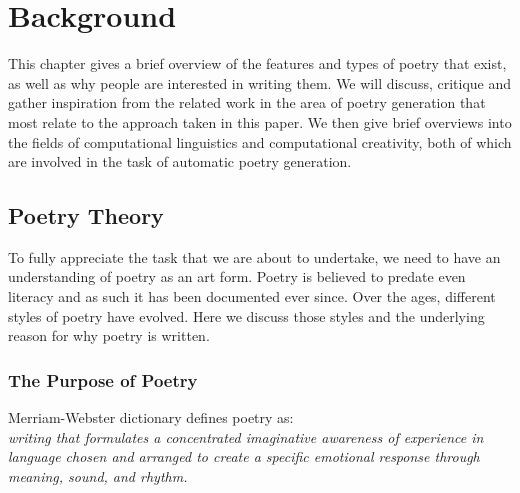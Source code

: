 
\chapter{Background}
\ifpdf
    \graphicspath{{Design/DesignFigs/PNG/}{Design/DesignFigs/PDF/}{Design/DesignFigs/}}
\else
    \graphicspath{{Design/DesignFigs/EPS/}{Design/DesignFigs/}}
\fi

This chapter gives a brief overview of the features and types of poetry that exist, as well as why people are interested in writing them. We will discuss, critique and gather inspiration from the related work in the area of poetry generation that most relate to the approach taken in this paper. We then give brief overviews into the fields of computational linguistics and computational creativity, both of which are involved in the task of automatic poetry generation. 

\section{Poetry Theory}

To fully appreciate the task that we are about to undertake, we need to have an understanding of poetry as an art form. Poetry is believed to predate even literacy and as such it has been documented ever since. Over the ages, different styles of poetry have evolved. Here we discuss those styles and the underlying reason for why poetry is written.

\subsection{The Purpose of Poetry}

Merriam-Webster dictionary defines poetry as:\\
\emph{writing that formulates a concentrated imaginative awareness of experience in language chosen and arranged to create a specific emotional response through meaning, sound, and rhythm.}\\

